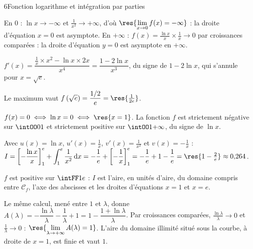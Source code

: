 \begin{corrigeBac}{6}{Fonction logarithme et intégration par parties}
\begin{questions}
  \item En $0$ : $\ln x\to-\infty$ et $\frac1{x^{2}}\to+\infty$, d'où $\res{\lim\limits_{x\to0}f(x)=-\infty}$ : la droite d'équation
    $x=0$ est asymptote. En $+\infty$ : $f(x)=\frac{\ln x}{x}\times\frac1x\to0$ par croissances comparées : la droite d'équation $y=0$
    est asymptote en $+\infty$. \pts{1 pt}
  \item $f'(x)=\dfrac{\frac1x\times x^{2}-\ln x\times2x}{x^{4}}=\dfrac{1-2\ln x}{x^{3}}$, du signe de $1-2\ln x$, qui s'annule pour
    $x=\sqrt e$.
\begin{center}
\begin{tableau}
\end{tableau}
\end{center}
    Le maximum vaut $f\left(\sqrt e\right)=\dfrac{1/2}{e}=\res{\tfrac{1}{2e}}$. 
  \item $f(x)=0\iff\ln x=0\iff\res{x=1}$. La fonction $f$ est strictement négative sur $\intOO01$ et strictement positive sur
    $\intOO1{+\infty}$, du signe de $\ln x$. 
\end{questions}
\begin{questions}[resume]
  \item Avec $u(x)=\ln x$, $u'(x)=\frac1x$, $v'(x)=\frac1{x^{2}}$ et $v(x)=-\frac1x$ :
    $I=\left[-\dfrac{\ln x}{x}\right]_1^{e}+\displaystyle\int_1^{e}\frac{1}{x^{2}}\,\mathrm{d}x=-\frac1e+\left[-\frac1x\right]_1^{e}
    =-\frac1e+1-\frac1e=\res{1-\tfrac2e}\approx0{,}264$. 
  \item $f$ est positive sur $\intFF1e$ : $I$ est l'aire, en unités d'aire, du domaine compris entre $\mathcal{C}_f$, l'axe des
    abscisses et les droites d'équations $x=1$ et $x=e$. 
  \item Le même calcul, mené entre $1$ et $\lambda$, donne $A(\lambda)=-\dfrac{\ln\lambda}{\lambda}-\dfrac1\lambda+1=1-\dfrac{1+\ln\lambda}{\lambda}$.
    Par croissances comparées, $\frac{\ln\lambda}{\lambda}\to0$ et $\frac1\lambda\to0$ : $\res{\lim\limits_{\lambda\to+\infty}A(\lambda)=1}$.
    L'aire du domaine illimité situé sous la courbe, à droite de $x=1$, est finie et vaut $1$. \pts{1 pt}
\end{questions}
\end{corrigeBac}
